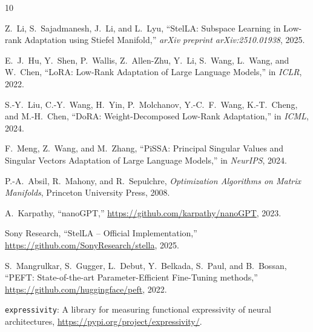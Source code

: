 \documentclass[11pt, a4paper]{article}
\begin{document}
\begin{thebibliography}{10}

Z.~Li, S.~Sajadmanesh, J.~Li, and L.~Lyu,
``StelLA: Subspace Learning in Low-rank Adaptation using Stiefel Manifold,''
\textit{arXiv preprint arXiv:2510.01938}, 2025.

E.~J.~Hu, Y.~Shen, P.~Wallis, Z.~Allen-Zhu, Y.~Li, S.~Wang, L.~Wang, and W.~Chen,
``LoRA: Low-Rank Adaptation of Large Language Models,''
in \textit{ICLR}, 2022.

S.-Y.~Liu, C.-Y.~Wang, H.~Yin, P.~Molchanov, Y.-C.~F.~Wang, K.-T.~Cheng, and M.-H.~Chen,
``DoRA: Weight-Decomposed Low-Rank Adaptation,''
in \textit{ICML}, 2024.

F.~Meng, Z.~Wang, and M.~Zhang,
``PiSSA: Principal Singular Values and Singular Vectors Adaptation of Large Language Models,''
in \textit{NeurIPS}, 2024.

P.-A.~Absil, R.~Mahony, and R.~Sepulchre,
\textit{Optimization Algorithms on Matrix Manifolds},
Princeton University Press, 2008.

A.~Karpathy,
``nanoGPT,''
\url{https://github.com/karpathy/nanoGPT}, 2023.

Sony Research,
``StelLA -- Official Implementation,''
\url{https://github.com/SonyResearch/stella}, 2025.

S.~Mangrulkar, S.~Gugger, L.~Debut, Y.~Belkada, S.~Paul, and B.~Bossan,
``PEFT: State-of-the-art Parameter-Efficient Fine-Tuning methods,''
\url{https://github.com/huggingface/peft}, 2022.

\texttt{expressivity}: A library for measuring functional expressivity of neural architectures,
\url{https://pypi.org/project/expressivity/}.

\end{thebibliography}
\end{document}
